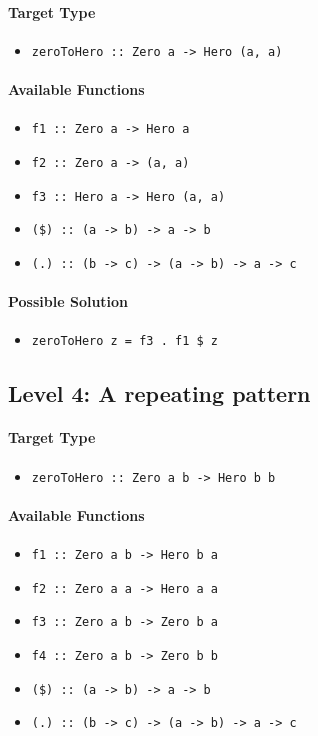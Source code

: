 \documentclass[preprint,12pt]{elsarticle}
\begin{document}
\paragraph{Target Type } 
\begin{itemize}
    \item \texttt{zeroToHero :: Zero a -> Hero (a, a)}
\end{itemize}

\paragraph{Available Functions} 
\begin{itemize}
    \item \texttt{f1 :: Zero a -> Hero a}
    \item \texttt{f2 :: Zero a -> (a, a)}
    \item \texttt{f3 :: Hero a -> Hero (a, a)}
    \item \texttt{(\$) :: (a -> b) -> a -> b}
    \item \texttt{(.) :: (b -> c) -> (a -> b) -> a -> c}
\end{itemize}

\paragraph{Possible Solution} 
\begin{itemize}
    \item \texttt{zeroToHero z = f3 . f1 \$ z}
\end{itemize}


\subsection{Level 4: A repeating pattern}
\paragraph{Target Type } 
\begin{itemize}
    \item \texttt{zeroToHero :: Zero a b -> Hero b b}
\end{itemize}

\paragraph{Available Functions} 
\begin{itemize}
    \item \texttt{f1 :: Zero a b -> Hero b a}
    \item \texttt{f2 :: Zero a a -> Hero a a}
    \item \texttt{f3 :: Zero a b -> Zero b a}
    \item \texttt{f4 :: Zero a b -> Zero b b}
    \item \texttt{(\$) :: (a -> b) -> a -> b}
    \item \texttt{(.) :: (b -> c) -> (a -> b) -> a -> c}
\end{itemize}
\end{document}
